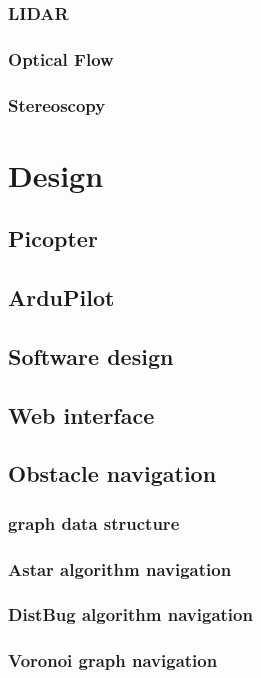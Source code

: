 \documentclass[a4paper, 12pt, titlepage]{article}
\begin{document}
        \subsubsection{LIDAR}
        \subsubsection{Optical Flow}
        \subsubsection{Stereoscopy}
        
\section{Design}
    \subsection{Picopter}
    \subsection{ArduPilot}
    \subsection{Software design}
    \subsection{Web interface}
    \subsection{Obstacle navigation}
        \subsubsection{graph data structure}
        \subsubsection{Astar algorithm navigation}
        \subsubsection{DistBug algorithm navigation}
        \subsubsection{Voronoi graph navigation}
\end{document}

